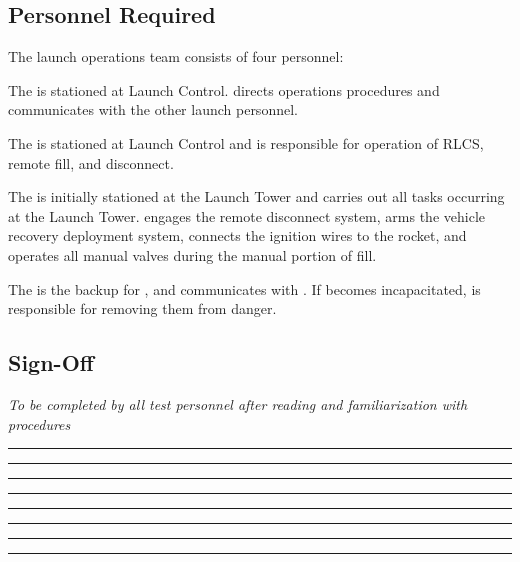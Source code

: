 \subsection{Personnel Required}
The launch operations team consists of four personnel:
\begin{checklist}
    \item The \opsfull{} is stationed at Launch Control. \ops{} directs operations procedures and communicates with the other launch personnel.
    \item The \controlfull{} is stationed at Launch Control and is responsible for operation of RLCS, remote fill, and disconnect.
    \item The \primaryfull{} is initially stationed at the Launch Tower and carries out all tasks occurring at the Launch Tower. \primary{} engages the remote disconnect system, arms the vehicle recovery deployment system, connects the ignition wires to the rocket, and operates all manual valves during the manual portion of fill.
    \item The \secondaryfull{} is the backup for \primary{}, and communicates with \ops{}. If \primary{} becomes incapacitated, \secondary{} is responsible for removing them from danger.
\end{checklist}
\setcounter{checklistnum}{0}

\subsection{Sign-Off}
\textit{To be completed by all test personnel after reading and familiarization with procedures}
\begin{checklist}
    \item \opsfull      \tabto{25em}\rule{10em}{0.4pt}\hspace{5em}\rule{10em}{0.4pt}
    \item \controlfull      \tabto{25em}\rule{10em}{0.4pt}\hspace{5em}\rule{10em}{0.4pt}
    \item \primaryfull  \tabto{25em}\rule{10em}{0.4pt}\hspace{5em}\rule{10em}{0.4pt}
    \item \secondaryfull\tabto{25em}\rule{10em}{0.4pt}\hspace{5em}\rule{10em}{0.4pt}
\end{checklist}
\setcounter{checklistnum}{0}
\newpage{}

